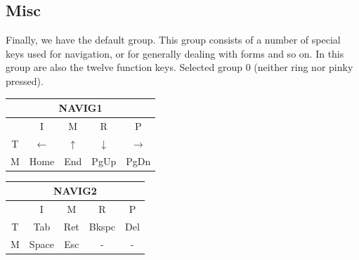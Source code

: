\documentclass{article}
\begin{document}
\subsection{Misc}
Finally, we have the default group. This group consists of a number of special keys used for navigation, or for generally dealing with forms and so on. In this group are also the twelve function keys. Selected group 0 (neither ring nor pinky pressed).

\begin{center}
	\begin{table}[!h]
		\begin{subtable}{0.45\textwidth}
			\centering
			\begin{tabular}{|c|c|c|c|c|}
				\hline
				\multicolumn{5}{|c|}{NAVIG1}\\ \hline
				& I & M & R & P \\ \hline
				T & $\leftarrow$ & $\uparrow$ & $\downarrow$ & $\rightarrow$ \\ \hline
				M & Home & End & PgUp & PgDn \\ \hline
			\end{tabular}
		\end{subtable}
		\begin{subtable}{0.45\textwidth}
			\centering
			\begin{tabular}{|c|c|c|c|c|}
				\hline
				\multicolumn{5}{|c|}{NAVIG2}\\ \hline
				& I & M & R & P \\ \hline
				T & Tab & Ret & Bkspc & Del \\ \hline
				M & Space & Esc & - & - \\ \hline
			\end{tabular}
		\end{subtable}
	\end{table}
\end{center}
\end{document}

